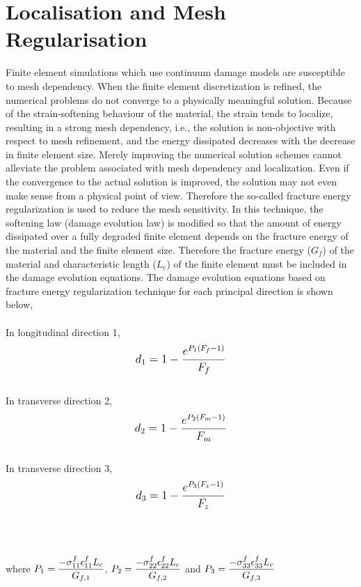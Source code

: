 \documentclass[12pt,twoside]{report}
\begin{document}
\section{Localisation and Mesh Regularisation}\label{Mesh Regularisation}
\indent\indent\indent Finite element simulations which use continuum damage models are susceptible to mesh dependency. When the finite element discretization is refined, the numerical problems do not converge to a physically meaningful solution. Because of the strain-softening behaviour of the material, the strain tends to localize, resulting in a strong mesh dependency, i.e., the solution is non-objective with respect to mesh refinement, and the energy dissipated decreases with the decrease in finite element size. Merely improving the numerical solution schemes cannot alleviate the problem associated with mesh dependency and localization. Even if the convergence to the actual solution is improved, the solution may not even make sense from a physical point of view. Therefore the so-called fracture energy regularization is used to reduce the mesh sensitivity. In this technique, the softening law (damage evolution law) is modified so that the amount of energy dissipated over a fully degraded finite element depends on the fracture energy of the material and the finite element size. Therefore the fracture energy ($G_f$) of the material and characteristic length ($L_{c}$) of the finite element must be included in the damage evolution equations. The damage evolution equations based on fracture energy regularization technique for each principal direction is shown below, \\
\\
In longitudinal direction 1,
\begin{equation}
\label{d1}
\mathlarger{d_{1} = 1 - \frac{e^{P_{1}(F_{f} - 1)}}{F_{f}}}
\end{equation}
\\
In transverse direction 2,
\begin{equation}
\label{d2}  
\mathlarger{d_{2} = 1 - \frac{e^{P_{2}(F_{m} - 1)}}{F_{m}}}
\end{equation}
\\
In transverse direction 3,
\begin{equation}
\label{d3} 
\mathlarger{d_{3} = 1 - \frac{e^{P_{3}(F_{z} - 1)}}{F_{z}}}
\end{equation}
\\
\\
\\
where $\mathlarger{P_{1} = \frac{-\sigma_{11}^{f}\epsilon_{11}^{f}L_{c}}{G_{f,1}}}$, $\mathlarger{P_{2} = \frac{-\sigma_{22}^{f}\epsilon_{22}^{f}L_{c}}{G_{f,2}}}$ and $\mathlarger{P_{3} = \frac{-\sigma_{33}^{f}\epsilon_{33}^{f}L_{c}}{G_{f,3}}}$ 
\end{document}
